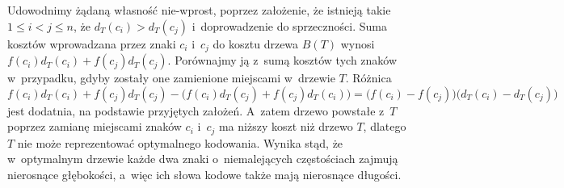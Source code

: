 Udowodnimy żądaną własność nie-wprost, poprzez założenie, że istnieją takie $1\le i<j\le n$, że $d_T(c_i)>d_T(c_j)$ i~doprowadzenie do sprzeczności.
Suma kosztów wprowadzana przez znaki $c_i$ i~$c_j$ do kosztu drzewa $B(T)$ wynosi $f(c_i)d_T(c_i)+f(c_j)d_T(c_j)$.
Porównajmy ją z~sumą kosztów tych znaków w~przypadku, gdyby zostały one zamienione miejscami w~drzewie $T$.
Różnica
\[
	f(c_i)d_T(c_i)+f(c_j)d_T(c_j)-\bigl(f(c_i)d_T(c_j)+f(c_j)d_T(c_i)\bigr) = \bigl(f(c_i)-f(c_j)\bigr)\bigl(d_T(c_i)-d_T(c_j)\bigr)
\]
jest dodatnia, na podstawie przyjętych założeń.
A~zatem drzewo powstałe z~$T$ poprzez zamianę miejscami znaków $c_i$ i~$c_j$ ma niższy koszt niż drzewo $T$, dlatego $T$ nie może reprezentować optymalnego kodowania.
Wynika stąd, że w~optymalnym drzewie każde dwa znaki o~niemalejących częstościach zajmują nierosnące głębokości, a~więc ich słowa kodowe także mają nierosnące długości.

\exercise %
\exercise %
\exercise %
\exercise %
